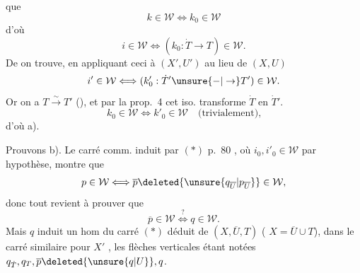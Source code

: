 
que
\[
 k\in\mathcal W\Longleftrightarrow k_0\in\mathcal W
\]
d'où
\[
 i\in\mathcal W\Longleftrightarrow(k_0:\dot T\to T)\in\mathcal W.
\]
De   on trouve, en appliquant ceci à
$(X',U')$ au lieu de $(X,U)$
\[
 i'\in\mathcal W\Longleftrightarrow(k'_0:\dot T'\unsure{-|\to}T')\in\mathcal W.
\]
Or on a $T\xrightarrow{\sim}T'$ (), et par la prop.~4
cet iso. transforme $\dot T$ en $\dot T'$. 
\[
 k_0\in\mathcal W\Longleftrightarrow k'_0\in\mathcal W\quad\text{(trivialement),}
\]
d'où a).

Prouvons b). Le carré comm. induit par $(*)$ p.~80
\noindent,
où $i_0,i'_0\in\mathcal W$ par hypothèse, montre que
\[
 p\in\mathcal W\Longleftrightarrow\overline p\deleted{\unsure{q_{\overline U}|p_{\overline U}}}\in\mathcal W,
\]
donc tout revient à prouver que
\[
 \overline p\in\mathcal W\overset{?}{\Longleftrightarrow}q\in\mathcal W.
\]
Mais $q$ induit un hom du carré $(*)$ déduit
de  $(X,\overline U,T)$ ( $X=\overline U\cup T$), dans le
carré similaire pour $X'$
\noindent,
les flèches verticales étant notées $q_{\dot T},q_T,\overline p\deleted{\unsure{q|U}},q$.

